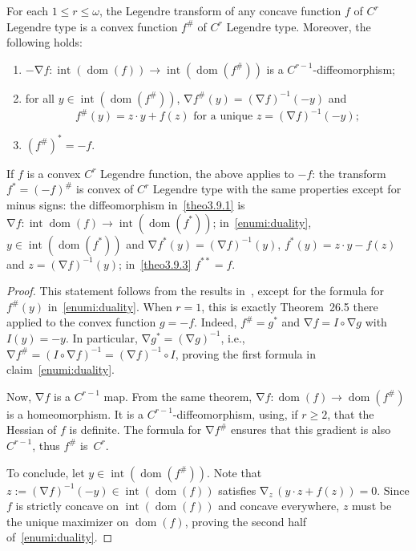 \documentclass[AHL, Unicode, longabstracts,published]{cedram}
\theoremstyle{plain}
\theoremstyle{plain}
\newcommand\dom{\operatorname{dom}}
\newcommand\inter{\operatorname{int}}
\newcommand{\grad}{\operatorname{\nabla}}
\newcounter{In}
\newcommand*\8{\infty}
\newcommand*{\romanenumi}{\renewcommand*{\theenumi}{\roman{enumi}}}
\begin{document}
\begin{theo}\label{theo-Legendre}
For each $1\leq r\leq\omega$, the Legendre transform of any concave function $f$ of $C^r$ Legendre type is a convex function $f^\#$ of $C^r$ Legendre type. Moreover, the following holds:
\begin{enumerate}\romanenumi
\item\label{theo3.9.1} $ -\grad f:\inter(\dom(f))\to\inter(\dom(f^\#))$ is a $C^{r-1}$-diffeomorphism;
\item\label{enumi:duality}
for all $y\in\inter(\dom(f^\#))$, $\grad f^\# (y) = (\grad f)^{-1}(-y)$ and
\[
f^\#(y)=z\cdot y+f(z) \text{ for a unique }z=(\grad f)^{-1}(-y);
\]
\item\label{theo3.9.3} $(f^{\#})^*=-f$.
\end{enumerate}
\end{theo}


If $f$ is a convex $C^r$ Legendre function, the above applies to $-f$: the transform $f^*=(-f)^\#$ is convex of $C^r$ Legendre type with the same properties except for minus signs: the diffeomorphism in~\eqref{theo3.9.1} is $\grad f:\inter\dom(f)\to\inter(\dom(f^*))$; in~\eqref{enumi:duality}, $y\in\inter(\dom(f^*))$ and $\grad f^*(y)=(\grad f)^{-1}(y)$, $f^*(y)=z\cdot y-f(z)$ and $z=(\grad f)^{-1}(y)$; in~\eqref{theo3.9.3} $f^{**}=f$.


\begin{proof}
This statement follows from the results in~\cite[Chapitre~26]{Rockafellar-book}, except for the formula for $f^\#(y)$ in~\eqref{enumi:duality}. When $r=1$, this is exactly Theorem~26.5 there applied to the convex function $g=-f$. Indeed, $f^\#=g^*$ and $\grad f = I\circ\grad g$ with $I(y)=-y$. In particular, $\grad g^* = (\grad g)^{-1}$, i.e., $\grad f^\# = (I\circ\grad f)^{-1} =(\grad f)^{-1}\circ I$, proving the first formula in claim~\eqref{enumi:duality}.

Now, $\grad f$ is a $C^{r-1}$ map. From the same theorem, $\grad f:\dom(f)\to\dom(f^\#)$ is a homeomorphism. It is a $C^{r-1}$-diffeomorphism, using, if $r\geq2$, that the Hessian of $f$ is definite. The formula for $\grad f^\#$ ensures that this gradient is also $C^{r-1}$, thus $f^\#$ is~$C^r$.

To conclude, let $y\in\inter(\dom(f^\#))$. Note that $ z := (\grad f)^{-1}(-y)\in\inter(\dom(f))$ satisfies $\grad_{ z}\,(y\cdot z+f(z))=0$. Since $f$ is strictly concave on $\inter(\dom(f))$ and concave everywhere, $ z$ must be the unique maximizer on $\dom(f)$, proving the second half of~\eqref{enumi:duality}.
\end{proof}
\end{document}
